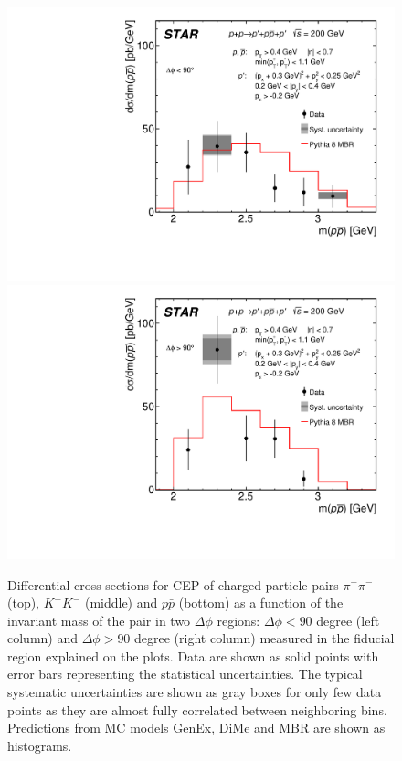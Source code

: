 \begin{figure}[h]
\hspace*{5pt}
\includegraphics[width=.46\textwidth,page=1]{graphics/physicsResults/FinalResult_InvMass_DeltaPhiBin1_proton.pdf}
\hfill
\includegraphics[width=.46\textwidth,page=1]{graphics/physicsResults/FinalResult_InvMass_DeltaPhiBin2_proton.pdf}
\hspace*{5pt}
%
\caption{Differential cross sections for CEP of charged particle pairs $\pi^+\pi^-$ (top), $K^+K^-$ (middle) and $p\bar{p}$ (bottom) as a function of the invariant mass of the pair in two $\Delta\phi$ regions: $\Delta\phi<90$ degree (left column) and $\Delta\phi>90$ degree (right column) measured in the fiducial region explained on the plots. Data are shown as solid points with error bars representing the statistical uncertainties. The typical systematic uncertainties are shown as gray boxes for only few data points as they are almost fully correlated between neighboring bins. Predictions from MC models GenEx, DiMe and MBR are shown as histograms.}
\label{results_3}
\end{figure}
